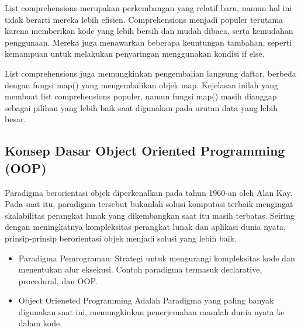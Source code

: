 \documentclass{article}
\begin{document}
List comprehensions merupakan perkembangan yang relatif baru, namun hal ini tidak berarti mereka lebih efisien. Comprehensions menjadi populer terutama karena memberikan kode yang lebih bersih dan mudah dibaca, serta kemudahan penggunaan. Mereka juga menawarkan beberapa keuntungan tambahan, seperti kemampuan untuk melakukan penyaringan menggunakan kondisi if else.

List comprehensions juga memungkinkan pengembalian langsung daftar, berbeda dengan fungsi map() yang mengembalikan objek map. Kejelasan inilah yang membuat list comprehensions populer, namun fungsi map() masih dianggap sebagai pilihan yang lebih baik saat digunakan pada urutan data yang lebih besar.

\subsection{Konsep Dasar Object Oriented Programming (OOP)}
Paradigma berorientasi objek diperkenalkan pada tahun 1960-an oleh Alan Kay. Pada saat itu, paradigma tersebut bukanlah solusi komputasi terbaik mengingat skalabilitas perangkat lunak yang dikembangkan saat itu masih terbatas. Seiring dengan meningkatnya kompleksitas perangkat lunak dan aplikasi dunia nyata, prinsip-prinsip berorientasi objek menjadi solusi yang lebih baik.
\begin{itemize}
    \item Paradigma Pemrograman: Strategi untuk mengurangi kompleksitas kode dan menentukan alur eksekusi. Contoh paradigma termasuk declarative, procedural, dan OOP.
    \item Object Orieneted Programming Adalah Paradigma yang paling banyak digunakan saat ini, memungkinkan penerjemahan masalah dunia nyata ke dalam kode.
\end{itemize}
\end{document}
